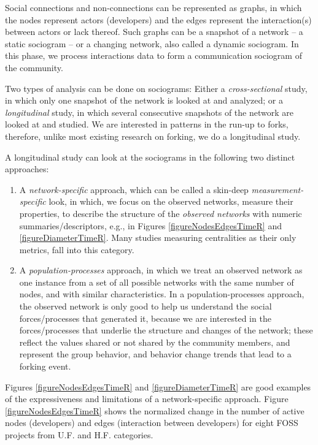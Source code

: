\documentclass[12pt]{report}
\begin{document}
Social connections and non-connections can be represented as graphs, in which the nodes represent actors (developers) and the edges represent the interaction(s) between actors or lack thereof. Such graphs can be a snapshot of a network -- a static sociogram -- or a changing network, also called a dynamic sociogram. In this phase, we process interactions data to form a communication sociogram of the community. 

Two types of analysis can be done on sociograms: Either a \textit{cross-sectional} study, in which only one snapshot of the network is looked at and analyzed; or a \textit{longitudinal} study, in which several consecutive snapshots of the network are looked at and studied.  We are interested in patterns in the run-up to forks, therefore, unlike most existing research on forking, we do a longitudinal study.

A longitudinal study can look at the sociograms in the following two distinct approaches: 
\begin{enumerate}
\item A \textit{network-specific} approach, which can be called a skin-deep \textit{measurement-specific} look, in which, we focus on the observed networks, measure their properties, to describe the structure of the \textit{observed networks} with numeric summaries/descriptors, e.g., in Figures \ref{figureNodesEdgesTimeR} and \ref{figureDiameterTimeR}. Many studies measuring centralities as their only metrics, fall into this category. 

\item A \textit{population-processes} approach, in which we treat an observed network as one instance from a set of all possible networks with the same number of nodes, and with similar characteristics. In a population-processes approach, the observed network is only good to help us understand the social forces/processes that generated it, because we are interested in the forces/processes that underlie the structure and changes of the network; these reflect the values shared or not shared by the community members, and represent the group behavior, and behavior change trends that lead to a forking event. 

\end{enumerate}

Figures \ref{figureNodesEdgesTimeR} and \ref{figureDiameterTimeR} are good examples of the expressiveness and limitations of a network-specific approach. Figure \ref{figureNodesEdgesTimeR} shows the normalized change in the number of active nodes (developers) and edges (interaction between developers) for eight FOSS projects from U.F. and H.F. categories. 
\end{document}
